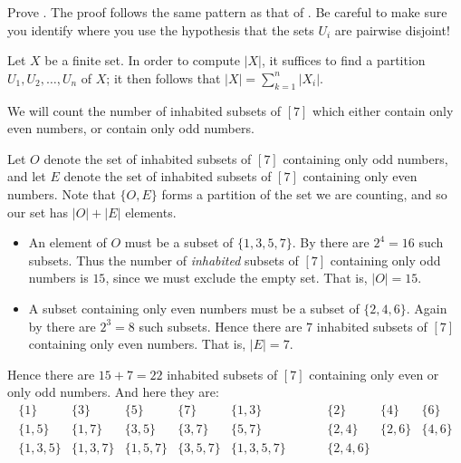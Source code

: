 \begin{exercise}
Prove . The proof follows the same pattern as that of . Be careful to make sure you identify where you use the hypothesis that the sets $U_i$ are pairwise disjoint!
\end{exercise}

\begin{strategy}
\label{strAdditionPrinciple}
Let $X$ be a finite set. In order to compute $|X|$, it suffices to find a partition $U_1, U_2, \dots, U_n$ of $X$; it then follows that $|X| = \sum_{k=1}^n |X_i|$.
\end{strategy}

\begin{example}
We will count the number of inhabited subsets of $[7]$ which either contain only even numbers, or contain only odd numbers.

Let $O$ denote the set of inhabited subsets of $[7]$ containing only odd numbers, and let $E$ denote the set of inhabited subsets of $[7]$ containing only even numbers. Note that $\{ O, E \}$ forms a partition of the set we are counting, and so our set has $|O|+|E|$ elements.
\begin{itemize}
\item An element of $O$ must be a subset of $\{1,3,5,7\}$. By  there are $2^4=16$ such subsets. Thus the number of \textit{inhabited} subsets of $[7]$ containing only odd numbers is $15$, since we must exclude the empty set. That is, $|O|=15$.
\item A subset containing only even numbers must be a subset of $\{2,4,6\}$. Again by  there are $2^3=8$ such subsets. Hence there are $7$ inhabited subsets of $[7]$ containing only even numbers. That is, $|E|=7$.
\end{itemize}
Hence there are $15+7=22$ inhabited subsets of $[7]$ containing only even or only odd numbers. And here they are:
\[ \begin{matrix}
\{ 1 \} & \{ 3 \} & \{ 5 \} & \{ 7 \} & \{ 1, 3 \} & \hspace{20pt} & \{ 2 \} & \{ 4 \} & \{ 6 \} \\
\{ 1, 5 \} & \{ 1, 7 \} & \{ 3, 5 \} & \{ 3, 7 \} & \{ 5, 7 \} && \{ 2, 4 \} & \{ 2, 6 \} & \{ 4, 6 \} \\
\{ 1, 3, 5 \} & \{ 1, 3, 7 \} & \{ 1, 5, 7 \} & \{ 3, 5, 7 \} & \{ 1, 3, 5, 7\} && \{ 2, 4, 6 \} && 
\end{matrix} \]
\end{example}

